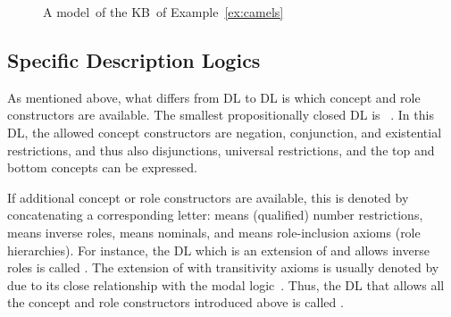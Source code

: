 \begin{figure}[t]
    \centering
    \caption{A model~\Imc of the KB~\Kmc of Example~\ref{ex:camels}}
    \label{fig:camels-model}
\end{figure}


\subsection{Specific Description Logics}

As mentioned above, what differs from DL to DL is which concept and role
constructors are available.  The smallest propositionally closed DL is
\ALC~\cite{ScSm-AIJ91}.  In this DL, the allowed concept constructors are
negation, conjunction, and existential restrictions, and thus also disjunctions,
universal restrictions, and the top and bottom concepts can be expressed.

If additional concept or role constructors are available, this is denoted by
concatenating a corresponding letter: \Qmc means (qualified) number
restrictions, \Imc means inverse roles, \Omc means nominals, and \Hmc means
role-inclusion axioms (role hierarchies).  For instance, the DL which is an
extension of \ALC and allows inverse roles is called \ALCI.  The extension of
\ALC with transitivity axioms is usually denoted by \Smc due to its close
relationship with the modal logic~\Sfour.  Thus, the DL that allows all the
concept and role constructors introduced above is called \SHOIQ.

